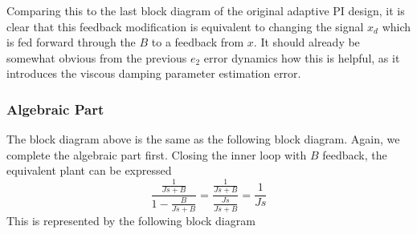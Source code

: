 Comparing this to the last block diagram of the original adaptive PI design, it is clear that this feedback modification is equivalent to changing the signal $x_{d}$ which is fed forward through the $B$ to a feedback from $x$.
It should already be somewhat obvious from the previous $e_{2}$ error dynamics how this is helpful, as it introduces the viscous damping parameter estimation error.

\subsubsection{Algebraic Part}

The block diagram above is the same as the following block diagram.
Again, we complete the algebraic part first.
Closing the inner loop with $B$ feedback, the equivalent plant can be expressed
\begin{equation*}
  \frac{\frac{1}{Js+B}}{1-\frac{B}{Js+B}}=\frac{\frac{1}{Js+B}}{\frac{Js}{Js+B}}=\frac{1}{Js}
\end{equation*}
This is represented by the following block diagram

\begin{figure}[H]
  \begin{center}
  \end{center}
\end{figure}

